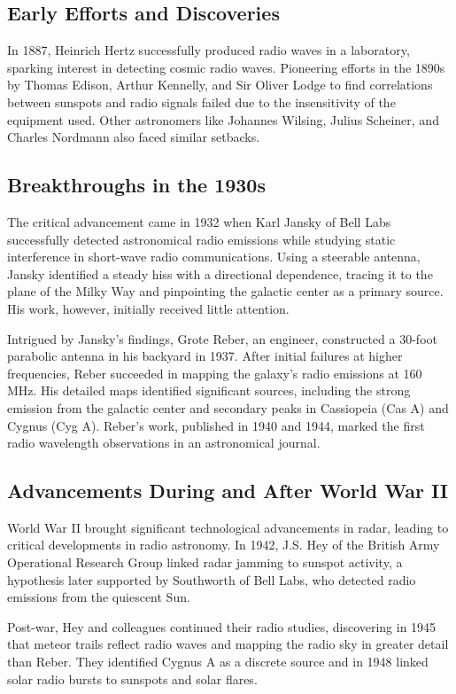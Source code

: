 \subsection{Early Efforts and Discoveries}
In 1887, Heinrich Hertz successfully produced radio waves in a laboratory, sparking interest in detecting cosmic radio waves. Pioneering efforts in the 1890s by Thomas Edison, Arthur Kennelly, and Sir Oliver Lodge to find correlations between sunspots and radio signals failed due to the insensitivity of the equipment used. Other astronomers like Johannes Wilsing, Julius Scheiner, and Charles Nordmann also faced similar setbacks.

\subsection{Breakthroughs in the 1930s}

The critical advancement came in 1932 when Karl Jansky of Bell Labs successfully detected astronomical radio emissions while studying static interference in short-wave radio communications. Using a steerable antenna, Jansky identified a steady hiss with a directional dependence, tracing it to the plane of the Milky Way and pinpointing the galactic center as a primary source. His work, however, initially received little attention.

Intrigued by Jansky's findings, Grote Reber, an engineer, constructed a 30-foot parabolic antenna in his backyard in 1937. After initial failures at higher frequencies, Reber succeeded in mapping the galaxy's radio emissions at 160 MHz. His detailed maps identified significant sources, including the strong emission from the galactic center and secondary peaks in Cassiopeia (Cas A) and Cygnus (Cyg A). Reber's work, published in 1940 and 1944, marked the first radio wavelength observations in an astronomical journal.

\subsection{Advancements During and After World War II}

World War II brought significant technological advancements in radar, leading to critical developments in radio astronomy. In 1942, J.S. Hey of the British Army Operational Research Group linked radar jamming to sunspot activity, a hypothesis later supported by Southworth of Bell Labs, who detected radio emissions from the quiescent Sun.

Post-war, Hey and colleagues continued their radio studies, discovering in 1945 that meteor trails reflect radio waves and mapping the radio sky in greater detail than Reber. They identified Cygnus A as a discrete source and in 1948 linked solar radio bursts to sunspots and solar flares.


